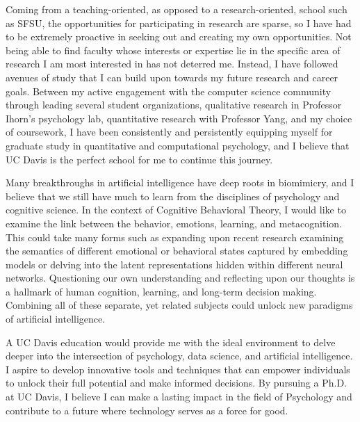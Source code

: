 \documentclass[12pt]{article}
\begin{document}
Coming from a teaching-oriented, as opposed to a research-oriented, school such as SFSU, the opportunities for participating in research are
sparse, so I have had to be extremely proactive in seeking out and creating my own opportunities. Not being able to find faculty
whose interests or expertise lie in the specific area of research I am most interested in has not deterred me. Instead, I have followed
avenues of study that I can build upon towards my future research and career goals. Between my active engagement with the computer science
community through leading several student organizations, qualitative research in Professor Ihorn's psychology lab, quantitative research
with Professor Yang, and my choice of coursework, I have been consistently and persistently equipping myself for graduate study in
quantitative and computational psychology, and I believe that UC Davis is the perfect school for me to continue this journey.

Many breakthroughs in artificial intelligence have deep roots in biomimicry, and I believe that we still have much to learn from the
disciplines of psychology and cognitive science.  In the context of Cognitive Behavioral Theory, I would like to examine the link between
the behavior, emotions, learning, and metacognition. This could take many forms such as expanding upon recent research examining the
semantics of different emotional or behavioral states captured by embedding models or delving into the latent representations hidden within
different neural networks. Questioning our own understanding and reflecting upon our thoughts is a hallmark of human cognition, learning,
and long-term decision making. Combining all of these separate, yet related subjects could unlock new paradigms of artificial intelligence.

A UC Davis education would provide me with the ideal environment to delve deeper into the intersection of psychology, data science, and
artificial intelligence. I aspire to develop innovative tools and techniques that can empower individuals to unlock their full
potential and make informed decisions. By pursuing a Ph.D. at UC Davis, I believe I can make a lasting impact in the field of
Psychology and contribute to a future where technology serves as a force for good.
\end{document}
